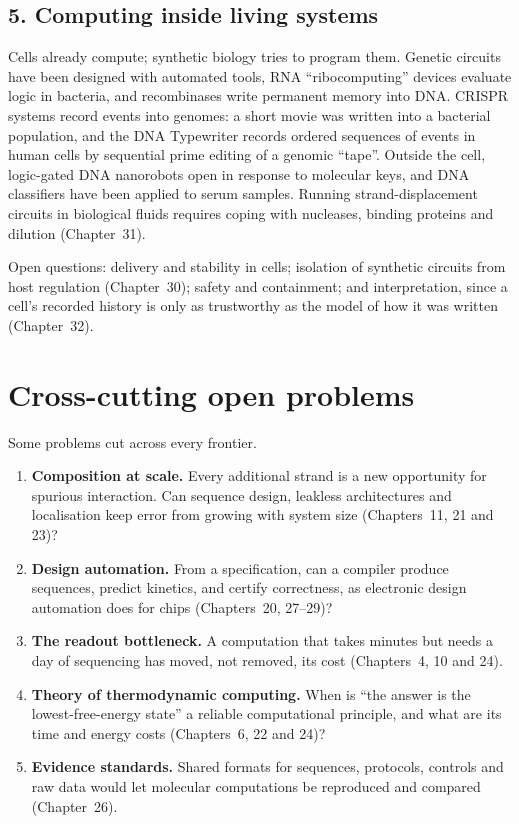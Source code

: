 \subsection*{5. Computing inside living systems}
Cells already compute; synthetic biology tries to program them. Genetic
circuits have been designed with automated tools,\cite{Nielsen2016} RNA
``ribocomputing'' devices evaluate logic in bacteria,\cite{Green2017} and
recombinases write permanent memory into DNA.\cite{Siuti2013,Bonnet2013}
CRISPR systems record events into genomes: a short movie was written into a
bacterial population,\cite{Shipman2017} and the DNA Typewriter records ordered
sequences of events in human cells by sequential prime editing of a genomic
``tape''.\cite{Choi2022} Outside the cell, logic-gated DNA nanorobots open
in response to molecular keys,\cite{Douglas2012} and DNA classifiers have been
applied to serum samples.\cite{Zhang2020cancer} Running strand-displacement
circuits in biological fluids requires coping with nucleases, binding proteins
and dilution (Chapter~31).\cite{FernSchulman2017,ZhongSczepanski2021}

Open questions: delivery and stability in cells; isolation of synthetic
circuits from host regulation (Chapter~30); safety and containment; and
interpretation, since a cell's recorded history is only as trustworthy as the
model of how it was written (Chapter~32).

\section*{Cross-cutting open problems}
Some problems cut across every frontier.
\begin{enumerate}
\item \textbf{Composition at scale.} Every additional strand is a new
opportunity for spurious interaction. Can sequence design, leakless
architectures and localisation keep error from growing with system size
(Chapters~11, 21 and 23)?
\item \textbf{Design automation.} From a specification, can a compiler produce
sequences, predict kinetics, and certify correctness, as electronic design
automation does for chips (Chapters~20, 27--29)?
\item \textbf{The readout bottleneck.} A computation that takes minutes but
needs a day of sequencing has moved, not removed, its cost
(Chapters~4, 10 and 24).
\item \textbf{Theory of thermodynamic computing.} When is ``the answer is the
lowest-free-energy state'' a reliable computational principle, and what are its
time and energy costs (Chapters~6, 22 and 24)?
\item \textbf{Evidence standards.} Shared formats for sequences, protocols,
controls and raw data would let molecular computations be reproduced and
compared (Chapter~26).\cite{Wilkinson2016}
\end{enumerate}

